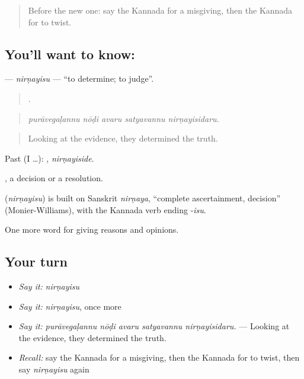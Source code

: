 \label{lesson:KA-C383-nirnayisu}



\begin{quote}
Before the new one: say the Kannada for a misgiving, then the Kannada for to twist.
\end{quote}

\subsection*{You'll want to know: }
\textbf{} — \emph{nirṇayisu} — \textquotedblleft{}to determine; to judge\textquotedblright{}.

\begin{quote}
    .
\end{quote}

\begin{quote}
\emph{purāvegaḷannu nōḍi avaru satyavannu nirṇayisidaru.}
\end{quote}

\begin{quote}
Looking at the evidence, they determined the truth.
\end{quote}

Past (I …): , \emph{nirṇayiside}.

, a decision or a resolution.

\begin{cousinweb}
\textbf{} (\emph{nirṇayisu}) is built on Sanskrit \emph{nirṇaya}, \textquotedblleft{}complete ascertainment, decision\textquotedblright{} (Monier-Williams), with the Kannada verb ending -\emph{isu}.
\end{cousinweb}

\begin{grammarlens}[title={What you've built}]
One more word for giving reasons and opinions.
\end{grammarlens}

\subsection*{Your turn}
\begin{itemize}
\raggedright
  \item \emph{Say it:} \emph{nirṇayisu}
  \item \emph{Say it:} \emph{nirṇayisu}, once more
  \item \emph{Say it:} \emph{purāvegaḷannu nōḍi avaru satyavannu nirṇayisidaru.} — Looking at the evidence, they determined the truth.
  \item \emph{Recall:} say the Kannada for a misgiving, then the Kannada for to twist, then say \emph{nirṇayisu} again
\end{itemize}

